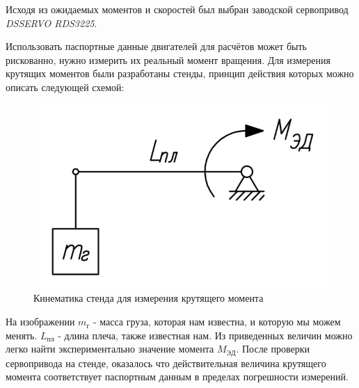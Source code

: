 Исходя из ожидаемых моментов и скоростей был выбран заводской сервопривод \textit{DSSERVO RDS3225}.

Использовать паспортные данные двигателей для расчётов может быть рискованно, нужно измерить их реальный момент вращения. Для измерения крутящих моментов были разработаны стенды, принцип действия которых можно описать следующей схемой:

\begin{figure}[ht]
    \centering
    \includegraphics[scale=0.7]{chapter_legged_robots/kin3.png}
    \caption{Кинематика стенда для измерения крутящего момента}
\end{figure}

На изображении $ m_г $ - масса груза, которая нам известна, и которую мы можем менять. $ L_{пл} $ - длина плеча, также известная нам. Из приведенных величин можно легко найти экспериментально значение момента $ M_ {ЭД} $. После проверки сервопривода на стенде, оказалось что действительная величина крутящего момента соответствует паспортным данным в пределах погрешности измерений.

